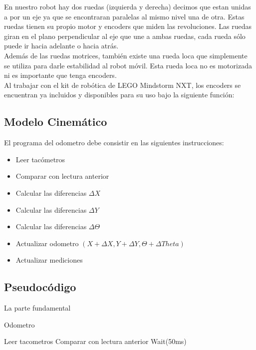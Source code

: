 \documentclass[oneside,twocolumn]{article}
\begin{document}
En nuestro robot hay dos ruedas (izquierda y derecha) decimos que estan unidas a por un eje ya que se encontraran paralelas al mismo nivel una de otra. Estas ruedas tienen su propio motor y encoders que miden las revoluciones. Las ruedas giran en el plano perpendicular al eje que une a ambas ruedas, cada rueda sólo puede ir hacia adelante o hacia atrás.\\

Además de las ruedas motrices, también existe una rueda loca que simplemente se utiliza para darle estabilidad al robot móvil. Esta rueda loca no es motorizada ni es importante que tenga encoders.\\

Al trabajar con el kit de robótica de LEGO Mindstorm NXT, los encoders se encuentran ya incluidos y disponibles para su uso bajo la siguiente función:\\


\subsection{Modelo Cinemático}

El programa del odometro debe consistir en las siguientes instrucciones:

\begin{itemize}
\item Leer tacómetros
\item Comparar con lectura anterior
\item Calcular las diferencias $\Delta X$
\item Calcular las diferencias $\Delta Y$
\item Calcular las diferencias $\Delta \Theta$
\item Actualizar odometro $(X+\Delta X, Y+\Delta Y, \Theta + \Delta Theta)$
\item Actualizar mediciones
\end{itemize}



\subsection{Pseudocódigo}

La parte fundamental

\begin{algorithm}
  \caption{Odometro}\label{alg:two}
  Leer tacometros\;
  Comparar con lectura anterior\;
  Wait(50ms)\;
\end{algorithm}
\end{document}
